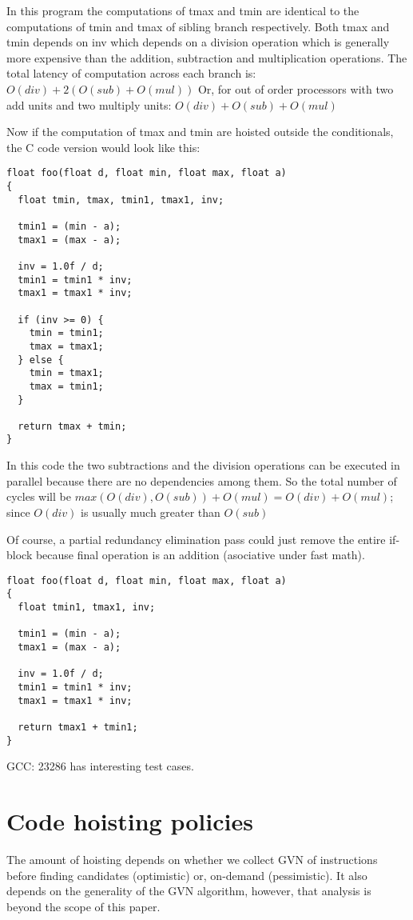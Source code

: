 \documentclass{sig-alternate}
\begin{document}
In this program the computations of tmax and tmin are identical to the
computations of tmin and tmax of sibling branch respectively. Both tmax and tmin
depends on inv which depends on a division operation which is generally more
expensive than the addition, subtraction and multiplication operations. The
total latency of computation across each branch is:
$O(div) + 2(O(sub) + O(mul))$
Or, for out of order processors with two add units and two multiply units:
$O(div) + O(sub) + O(mul)$

Now if the computation of tmax and tmin are hoisted outside the
conditionals, the C code version would look like this:
\begin{verbatim}
float foo(float d, float min, float max, float a)
{
  float tmin, tmax, tmin1, tmax1, inv;

  tmin1 = (min - a);
  tmax1 = (max - a);

  inv = 1.0f / d;
  tmin1 = tmin1 * inv;
  tmax1 = tmax1 * inv;

  if (inv >= 0) {
    tmin = tmin1;
    tmax = tmax1;
  } else {
    tmin = tmax1;
    tmax = tmin1;
  }

  return tmax + tmin;
}

\end{verbatim}

In this code the two subtractions and the division operations can be executed in
parallel because there are no dependencies among them. So the total number of
cycles will be $max(O(div), O(sub)) + O(mul) = O(div) + O(mul)$; since $O(div)$ is
usually much greater than $O(sub)$ \cite{x86,aarch64}

Of course, a partial redundancy elimination pass could just remove the entire
if-block because final operation is an addition (asociative under fast math).

\begin{verbatim}
float foo(float d, float min, float max, float a)
{
  float tmin1, tmax1, inv;

  tmin1 = (min - a);
  tmax1 = (max - a);

  inv = 1.0f / d;
  tmin1 = tmin1 * inv;
  tmax1 = tmax1 * inv;

  return tmax1 + tmin1;
}
\end{verbatim}


GCC: 23286 has interesting test cases.

\section{Code hoisting policies}
The amount of hoisting depends on whether we collect GVN of instructions
before finding candidates (optimistic) or, on-demand (pessimistic). It also
depends on the generality of the GVN algorithm, however, that analysis is beyond
the scope of this paper.
\end{document}
